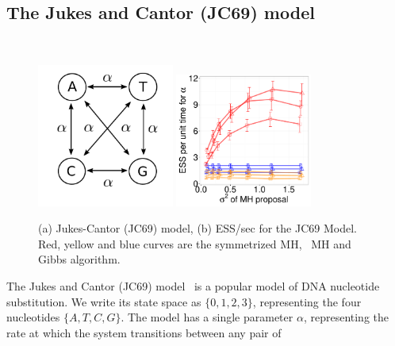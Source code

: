 {%
  \subsection{The Jukes and Cantor (JC69) model}~
  \begin{figure}%
  \begin{minipage}[!hp]{0.99\linewidth}
    \includegraphics[width=0.40\textwidth, angle=0]{figs/jc_model.pdf}
	\hspace{.5in}
    \includegraphics[width=0.40\textwidth, angle=0]{figs/jc.pdf}
  \end{minipage}
  \caption{(a) Jukes-Cantor (JC69) model, (b)
    ESS/sec for the JC69 Model. Red, yellow and blue curves are the 
      symmetrized MH, \naive\ MH and Gibbs algorithm. }
     \label{fig:ESS_JC}
  \end{figure}
  The Jukes and Cantor (JC69) model~\citep{jukescantor69} is a popular model of DNA nucleotide
  substitution.  We write its state space as $\{0, 1, 2, 3\}$, representing the 
  four nucleotides $\{A, T, C, G\}$.  The model has a single parameter $\alpha$, 
  representing the rate at which the system transitions between any pair of 
}
